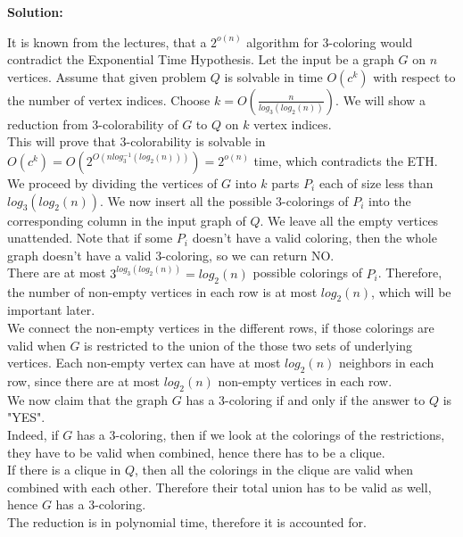 \documentclass[12pt]{article}
\newenvironment{solution}{\noindent\textbf{Solution:} \par\vspace{10pt}}{\par\vspace{10pt}}
\begin{document}
\begin{solution}
It is known from the lectures, that a $2^{o(n)}$ algorithm for 3-coloring would contradict the Exponential Time Hypothesis.  Let the input be a graph $G$ on $n$ vertices. Assume that given problem $Q$ is solvable in time $O(c^k)$ with respect to the number of vertex indices. Choose $k=O( \frac{n}{log_3(log_2(n))} )$. We will show a reduction from 3-colorability of $G$ to $Q$ on $k$ vertex indices. \\ 
This will prove that 3-colorability is solvable in $O(c^k) = O(2^{O(n log^{-1}_3(log_2(n)))}) = 2^{o(n)}$ time, which contradicts the ETH. \\
We proceed by dividing the vertices of $G$ into $k$ parts $P_i$ each of size less than $log_3(log_2(n))$. We now insert all the possible 3-colorings of $P_i$ into the corresponding column in the input graph of $Q$. We leave all the empty vertices unattended. Note that if some $P_i$ doesn't have a valid coloring, then the whole graph doesn't have a valid 3-coloring, so we can return NO. \\
There are at most $3^{log_3(log_2(n))} = log_2(n)$ possible colorings of $P_i$. Therefore, the number of non-empty vertices in each row is at most  $log_2(n)$, which will be important later. \\
We connect the non-empty vertices in the different rows, if those colorings are valid when $G$ is restricted to the union of the those two sets of underlying vertices. Each non-empty vertex can have at most $log_2(n)$ neighbors in each row, since there are at most $log_2(n)$ non-empty vertices in each row. \\
We now claim that the graph $G$ has a 3-coloring if and only if the answer to $Q$  is "YES". \\
Indeed, if $G$ has a 3-coloring, then if we look at the colorings of the restrictions, they have to be valid when combined, hence there has to be a clique. \\ 
If there is a clique in $Q$, then all the colorings in the clique are valid when combined with each other. Therefore their total union has to be valid as well, hence $G$ has a 3-coloring. \\
The reduction is in polynomial time, therefore it is accounted for.


\end{solution}

\vspace{20pt}
\end{document}
